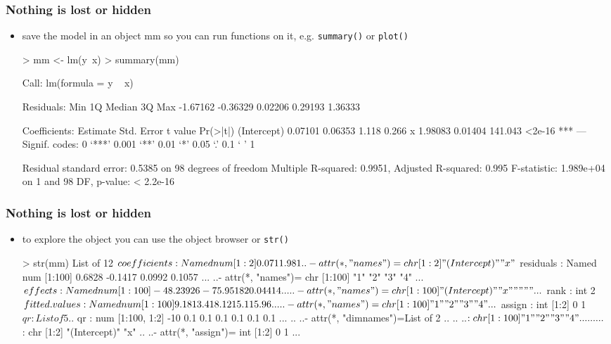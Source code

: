 \documentclass[xcolor={table},c]{beamer}
\begin{document}
\begin{frame}[fragile]\frametitle{Nothing is lost or hidden}
\begin{itemize}
\item save the model in an object mm so you can run functions on it, e.g. \texttt{summary()} or \texttt{plot()}
\scriptsize
\begin{semiverbatim}
> mm <- lm(y~x)
> summary(mm)

Call:
lm(formula = y ~ x)

Residuals:
     Min       1Q   Median       3Q      Max 
-1.67162 -0.36329  0.02206  0.29193  1.36333 

Coefficients:
            Estimate Std. Error t value Pr(>|t|)    
(Intercept)  0.07101    0.06353   1.118    0.266    
x            1.98083    0.01404 141.043   <2e-16 ***
---
Signif. codes:  0 ‘***’ 0.001 ‘**’ 0.01 ‘*’ 0.05 ‘.’ 0.1 ‘ ’ 1

Residual standard error: 0.5385 on 98 degrees of freedom
Multiple R-squared:  0.9951,	Adjusted R-squared:  0.995 
F-statistic: 1.989e+04 on 1 and 98 DF,  p-value: < 2.2e-16
\end{semiverbatim}
\end{itemize}
\end{frame}


\begin{frame}[fragile]\frametitle{Nothing is lost or hidden}
\begin{itemize}
\item to explore the object you can use the object browser or \texttt{str()}
\scriptsize
\begin{semiverbatim}
> str(mm)
List of 12
 $ coefficients : Named num [1:2] 0.071 1.981
  ..- attr(*, "names")= chr [1:2] "(Intercept)" "x"
 $ residuals    : Named num [1:100] 0.6828 -0.1417 0.0992 0.1057 ...
  ..- attr(*, "names")= chr [1:100] "1" "2" "3" "4" ...
 $ effects      : Named num [1:100] -48.23926 -75.95182 0.04414 ...
  ..- attr(*, "names")= chr [1:100] "(Intercept)" "x" "" "" ...
 $ rank         : int 2
 $ fitted.values: Named num [1:100] 9.18 13.41 8.12 15.11 5.96 ...
  ..- attr(*, "names")= chr [1:100] "1" "2" "3" "4" ...
 $ assign       : int [1:2] 0 1
 $ qr           :List of 5
  ..$ qr   : num [1:100, 1:2] -10 0.1 0.1 0.1 0.1 0.1 0.1  ...
  .. ..- attr(*, "dimnames")=List of 2
  .. .. ..$ : chr [1:100] "1" "2" "3" "4" ...
  .. .. ..$ : chr [1:2] "(Intercept)" "x"
  .. ..- attr(*, "assign")= int [1:2] 0 1
...
\end{semiverbatim}
\end{itemize}
\end{frame}
\end{document}
